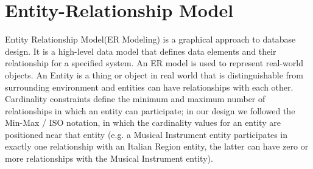 \documentclass[../../DD.tex]{subfiles}
\begin{document}
\section{Entity-Relationship Model \label{sect:5.2}}

	Entity Relationship Model(ER Modeling) is a graphical approach to database design. It is a high-level data model that defines data elements and their relationship for a specified system. An ER model is used to represent real-world objects. An Entity is a thing or object in real world that is distinguishable from surrounding environment and entities can have relationships with each other. Cardinality constraints define the minimum and maximum number of relationships in which an entity can participate; in our design we followed the Min-Max / ISO notation, in which the cardinality values for an entity are positioned near that entity (e.g. a Musical Instrument entity participates in exactly one relationship with an Italian Region entity, the latter can have zero or more relationships with the Musical Instrument entity).
	
	
\end{document}
